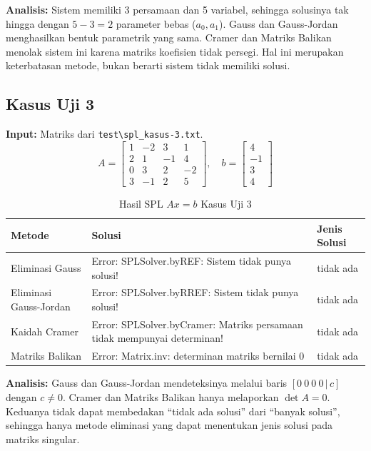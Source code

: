 \documentclass[12pt,a4paper]{report}
\begin{document}
\textbf{Analisis:} Sistem memiliki 3 persamaan dan 5 variabel, sehingga solusinya tak hingga dengan $5-3=2$ parameter bebas ($a_0,a_1$). Gauss dan Gauss-Jordan menghasilkan bentuk parametrik yang sama. Cramer dan Matriks Balikan menolak sistem ini karena matriks koefisien tidak persegi. Hal ini merupakan keterbatasan metode, bukan berarti sistem tidak memiliki solusi.

\subsection{Kasus Uji 3}
\textbf{Input:} Matriks dari \texttt{test\textbackslash spl\_kasus-3.txt}.
\[
A = \begin{bmatrix} 1 & -2 & 3 & 1  \\ 2 & 1 & -1 & 4 \\ 0 & 3 & 2 & -2 \\ 3 & -1 & 2 & 5 \end{bmatrix},
\quad
b = \begin{bmatrix}  4 \\ -1 \\ 3 \\4\end{bmatrix}
\]
 
 
\begin{table}[H]
    \centering
    \caption{Hasil SPL $Ax=b$ Kasus Uji 3}
    \begin{tabular}{|l|p{5cm}|l|}
        \hline
        \textbf{Metode} & \textbf{Solusi} & \textbf{Jenis Solusi} \\
        \hline
        Eliminasi Gauss & 
        Error: SPLSolver.byREF: Sistem tidak punya solusi!
        & tidak ada \\
        \hline
        Eliminasi Gauss-Jordan & 
        Error: SPLSolver.byRREF: Sistem tidak punya solusi!
        & tidak ada \\
        \hline
        Kaidah Cramer & 
        Error: SPLSolver.byCramer: Matriks persamaan tidak mempunyai determinan!
        & tidak ada \\
        \hline
        Matriks Balikan & 
        Error: Matrix.inv: determinan matriks bernilai 0
        & tidak ada \\
        \hline
    \end{tabular}
\end{table}
 
\textbf{Analisis:} Gauss dan Gauss-Jordan mendeteksinya melalui baris $[0\ 0\ 0\ 0\,|\,c]$ dengan $c\neq 0$. Cramer dan Matriks Balikan hanya melaporkan $\det A=0$. Keduanya tidak dapat membedakan ``tidak ada solusi'' dari ``banyak solusi'', sehingga hanya metode eliminasi yang dapat menentukan jenis solusi pada matriks singular.
\end{document}
